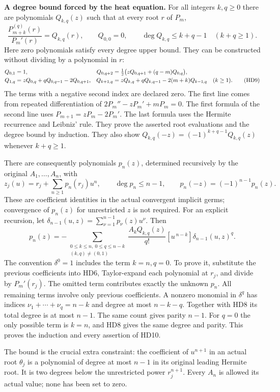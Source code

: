\HD\textbf{A degree bound forced by the heat equation.}
For all integers $k,q\ge0$ there are polynomials $Q_{k,q}(z)$
such that at every root $r$ of $P_m$,
\[
 \frac{P_{m+k}^{(q)}(r)}{P_m'(r)}=Q_{k,q}(r),\qquad
 Q_{0,0}=0,\qquad
 \deg Q_{k,q}\le k+q-1\quad(k+q\ge1).
 \tag{HD8}\label{hd:Qdegree}
\]
Here zero polynomials satisfy every degree upper bound.
They can be constructed without dividing by a polynomial in $r$:
\begin{align}
 Q_{0,1}&=1,&
 Q_{0,q+2}&=\tfrac12\bigl(zQ_{0,q+1}+(q-m)Q_{0,q}\bigr),\notag\\
 Q_{1,q}&=zQ_{0,q}+qQ_{0,q-1}-2Q_{0,q+1},&
 Q_{k+1,q}&=zQ_{k,q}+qQ_{k,q-1}-2(m+k)Q_{k-1,q}\quad(k\ge1).
 \tag{HD9}\label{hd:Qrecursion}
\end{align}
The terms with a negative second index are declared zero.
The first line comes from repeated differentiation of
$2P_m''-zP_m'+mP_m=0$.
The first formula of the second line uses
$P_{m+1}=zP_m-2P_m'$.
The last formula uses the Hermite recurrence and Leibniz' rule.
They prove the asserted root evaluations and the degree bound
by induction. They also show
$Q_{k,q}(-z)=(-1)^{k+q-1}Q_{k,q}(z)$ whenever $k+q\ge1$.

There are consequently polynomials $p_n(z)$, determined recursively
by the original $A_1,\ldots,A_n$, with
\[
 z_j(u)=r_j+\sum_{n\ge1}p_n(r_j)u^n,\qquad
 \deg p_n\le n-1,\qquad
 p_n(-z)=(-1)^{n-1}p_n(z).
 \tag{HD10}\label{hd:pdegree}
\]
These are coefficient identities in the actual convergent implicit
germs; convergence of $p_n(z)$ for unrestricted $z$ is not required.
For an explicit recursion, let $\delta_{n-1}(u,z)=
\sum_{\nu=1}^{n-1}p_\nu(z)u^\nu$. Then
\[
 p_n(z)=-
 \sum_{\substack{0\le k\le n,\ 0\le q\le n-k\\(k,q)\ne(0,1)}}
 \frac{A_kQ_{k,q}(z)}{q!}
      [u^{\,n-k}]\delta_{n-1}(u,z)^q .
 \tag{HD11}\label{hd:precursion}
\]
The convention $\delta^0=1$ includes the term $k=n,q=0$.
To prove it, substitute the previous coefficients into HD6,
Taylor-expand each polynomial at $r_j$, and divide by $P_m'(r_j)$.
The omitted term contributes exactly the unknown $p_n$.
All remaining terms involve only previous coefficients.
A nonzero monomial in $\delta^q$ has indices
$\nu_1+\cdots+\nu_q=n-k$ and degree at most $n-k-q$.
Together with HD8 its total degree is at most $n-1$.
The same count gives parity $n-1$. For $q=0$ the only possible
term is $k=n$, and HD8 gives the same degree and parity.
This proves the induction and every assertion of HD10.

The bound is the crucial extra constraint: the coefficient of
$u^{n+1}$ in an actual root $\theta_j$ is a polynomial of degree
at most $n-1$ in its original leading Hermite root.
It is two degrees below the unrestricted power $r_j^{n+1}$.
Every $A_n$ is allowed its actual value; none has been set to zero.


